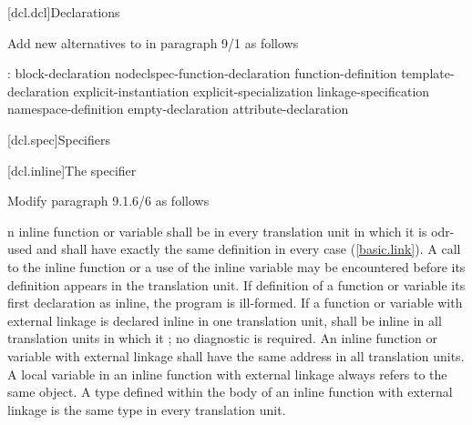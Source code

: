 \setcounter{chapter}{8}
[dcl.dcl]{Declarations}%


\noindent
Add new alternatives to  in paragraph 9/1 as follows
\begin{std.txt}
  \begin{bnf}
    :\br
      block-declaration\br
      nodeclspec-function-declaration\br
      function-definition\br
      template-declaration\br
      explicit-instantiation\br
      explicit-specialization\br
      linkage-specification\br
      namespace-definition\br
      empty-declaration\br
      attribute-declaration\br
      \br
  \end{bnf}
  \end{std.txt}


\setcounter{section}{0}
[dcl.spec]{Specifiers}%

\setcounter{subsection}{5}
[dcl.inline]{The  specifier}%

\noindent
Modify paragraph 9.1.6/6 as follows
\begin{std.txt}
  \resetalinea[5]
  \alinea
  n inline function or variable shall be 
   in every translation 
  unit in which it is odr-used and  shall have exactly 
  the same definition in every case (\ref{basic.link}).
  \enternote
  A call to the inline function or a use of 
  the inline variable may be encountered before its definition appears 
  in the translation unit.
  \exitnote
  If   definition of a function or variable
  its first declaration as inline,
  the program is ill-formed. If a 
  function or variable with external  linkage is 
  declared inline in one translation 
  unit,
    shall be
    inline
   in all translation units in which it 
  ; 
  no diagnostic is required. An inline function or variable with 
  external  linkage 
  shall have the same address in all translation units.
  \enternote
  A  local variable in an inline function with external 
   linkage always refers to the same object. A type 
  defined within the body 
  of an inline function with external  linkage is the 
  same type in every translation unit.
  \exitnote
\end{std.txt}

